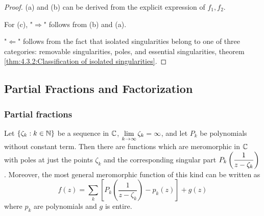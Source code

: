 \begin{proof}
    (a) and (b) can be derived from the explicit expression of  $ f_1,f_2 $.
    
    For (c), "$ \Rightarrow $" follows from (b) and (a).

    "$ \Leftarrow $" follows from the fact that isolated singularities belong to one of three categories: removable singularities, poles, and essential singularities, \ie theorem \ref{thm:4.3.2:Classification of isolated singularities}.
\end{proof}
\subsection{Partial Fractions and Factorization}
\subsubsection{Partial fractions}
\begin{theorem}\label{thm:5.2.1:Mittag-Leffler Theorem}
    Let  $ \{\zeta_k:k\in \mathbb N\} $ be a sequence in  $ \mathbb C  $,  $ \displaystyle\lim_{k\to\infty}\zeta_k=\infty $, and let  $ P_k  $ be polynomials without constant term. Then there are functions which are meromorphic in  $ \mathbb C  $ with poles at just the points  $ \zeta_k $ and the corresponding singular part  $ P_k\left(\displaystyle\frac{1}{z-\zeta_k}\right) $. Moreover, the most general meromorphic function of this kind can be written as
    \begin{equation}
        \label{eq:5.2.1:Mittag-Leffler Theorem}
        f(z)=\sum_{k}\left[P_{k}\left(\frac{1}{z-\zeta_k}\right)-p_k(z)\right]+g(z)
    \end{equation}
    where  $ p_k  $ are polynomials and  $ g $ is entire. 
\end{theorem}
